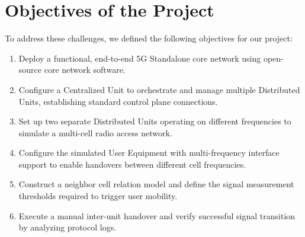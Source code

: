 \section{Objectives of the Project}
\justify
To address these challenges, we defined the following objectives for our project:
\begin{enumerate}[leftmargin=*]
    \item Deploy a functional, end-to-end 5G Standalone core network using open-source core network software.
    \item Configure a Centralized Unit to orchestrate and manage multiple Distributed Units, establishing standard control plane connections.
    \item Set up two separate Distributed Units operating on different frequencies to simulate a multi-cell radio access network.
    \item Configure the simulated User Equipment with multi-frequency interface support to enable handovers between different cell frequencies.
    \item Construct a neighbor cell relation model and define the signal measurement thresholds required to trigger user mobility.
    \item Execute a manual inter-unit handover and verify successful signal transition by analyzing protocol logs.
\end{enumerate}

